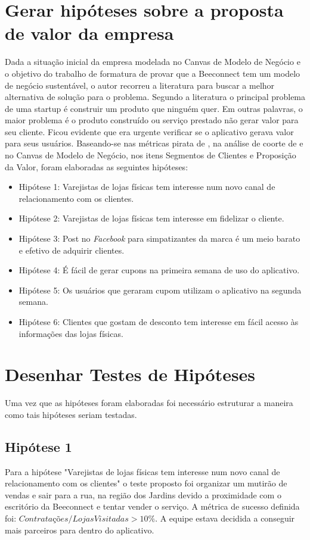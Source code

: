 \section{Gerar hipóteses sobre a proposta de valor da empresa}
\label{cha:gerar_hipoteses}
Dada a situação inicial da empresa modelada no Canvas de Modelo de Negócio e o objetivo do trabalho de formatura de provar que a Beeconnect tem um modelo de negócio sustentável, o autor recorreu a literatura para buscar a melhor alternativa de solução para o problema. 
Segundo a literatura o principal problema de uma startup é construir um produto que ninguém quer. Em outras palavras, o maior problema é o produto construído ou serviço prestado não gerar valor para seu cliente.
Ficou evidente que era urgente verificar se o aplicativo gerava valor para seus usuários. Baseando-se nas métricas pirata de , na análise de coorte de  e no Canvas de Modelo de Negócio, nos itens Segmentos de Clientes e Proposição da Valor, foram elaboradas as seguintes hipóteses:
\begin{itemize}
\item Hipótese 1: Varejistas de lojas físicas tem interesse num novo canal de relacionamento com os clientes.
\item Hipótese 2: Varejistas de lojas físicas tem interesse em fidelizar o cliente.
\item Hipótese 3: Post no \textit{Facebook} para simpatizantes da marca é um meio barato e efetivo de adquirir clientes.
\item Hipótese 4: É fácil de gerar cupons na primeira semana de uso do aplicativo.
\item Hipótese 5: Os usuários que geraram cupom utilizam o aplicativo na segunda semana.
\item Hipótese 6: Clientes que gostam de desconto tem interesse em fácil acesso às informações das lojas físicas.
\end{itemize}

\section{Desenhar Testes de Hipóteses}
\label{cha:desenhar_hipoteses}
Uma vez que as hipóteses foram elaboradas foi necessário estruturar a maneira como tais hipóteses seriam testadas. 

\subsection{Hipótese 1}
\label{cha:hip_1}
Para a hipótese "Varejistas de lojas físicas tem interesse num novo canal de relacionamento com os clientes" o teste proposto foi organizar um mutirão de vendas e sair para a rua, na região dos Jardins devido a proximidade com o escritório da Beeconnect e tentar vender o serviço. A métrica de sucesso definida foi:
$Contratações/Lojas Visitadas > 10\%$. A equipe estava decidida a conseguir mais parceiros para dentro do aplicativo.

